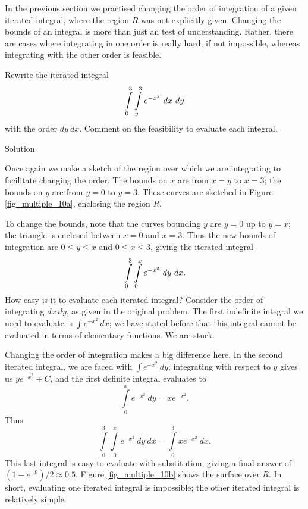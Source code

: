 In the previous section we practised changing the order of integration of a given iterated integral, where the region $R$ was not explicitly given. Changing the bounds of an integral is more than just an test of understanding. Rather, there are cases where integrating in one order is really hard, if not impossible, whereas integrating with the other order is feasible.

\begin{example}\label{ex_double6}
Rewrite the iterated integral 
$$\displaystyle \int\limits_0^3\int\limits_y^3 e^{-x^2}\ dx\ dy$$
with the order $dy\ dx$. Comment on the feasibility to evaluate each integral.

Solution 

Once again we make a sketch of the region over which we are integrating to facilitate changing the order. The bounds on $x$ are from $x=y$ to $x=3$; the bounds on $y$ are from $y=0$ to $y=3$. These curves are sketched in Figure \ref{fig_multiple_10a}, enclosing the region $R$.

To change the bounds, note that the curves bounding $y$ are $y=0$ up to $y=x$; the triangle is enclosed between $x=0$ and $x=3$. Thus the new bounds of integration are $0\leq y\leq x$ and $0\leq x\leq 3$, giving the iterated integral $$\displaystyle \int\limits_0^3\int\limits_0^x e^{-x^2}\ dy\ dx.$$ How easy is it to evaluate each iterated integral? Consider the order of integrating $dx\ dy$, as given in the original problem. The first indefinite integral we need to evaluate is $\int\limits e^{-x^2}\ dx$; we have stated before  that this integral cannot be evaluated in terms of elementary functions. We are stuck.

Changing the order of integration makes a big difference here. In the second iterated integral, we are faced with $\int\limits e^{-x^2}\ dy$; integrating with respect to $y$ gives us $ye^{-x^2}+C$, and the first definite integral evaluates to 
$$\int\limits_0^x e^{-x^2}\ dy = xe^{-x^2}.$$
Thus 
$$\int\limits_0^3\int\limits_0^x e^{-x^2}\ dy\ dx = \int\limits_0^3 xe^{-x^2}\ dx.$$
This last integral is easy to evaluate with substitution, giving a final answer of $(1-e^{-9})/2\approx 0.5$. Figure \ref{fig_multiple_10b} shows the surface over $R$. In short, evaluating one iterated integral is impossible; the other iterated integral is relatively simple.


\end{example}

